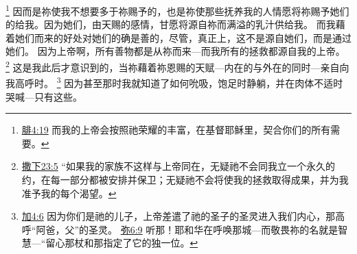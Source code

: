 \documentclass[12pt, a4paper, oneside]{ctexart}
\begin{document}
    \footnote {
        \href{https://biblehub.com/philippians/4-19.htm}{腓4:19} 而我的上帝会按照祂荣耀的丰富，在基督耶稣里，契合你们的所有需要。
	}
	因而是祢使我不想要多于祢赐予的，也是祢使那些抚养我的人情愿将祢赐予她们的给我。因为她们，由天赐的感情，甘愿将源自祢而满溢的乳汁供给我。
	而我藉着她们而来的好处对她们的确是善的，尽管，真正上，这不是源自她们，而是通过她们。
	因为上帝啊，所有善物都是从祢而来---而我所有的拯救都源自我的上帝。
    \footnote {
        \href{https://biblehub.com/2_samuel/23-5.htm}{撒下23:5} “如果我的家族不这样与上帝同在，无疑祂不会同我立一个永久的约，在每一部分都被安排并保卫；无疑祂不会将使我的拯救取得成果，并为我准予我的每个渴望。
	}
	这是我此后才意识到的，当祢藉着祢恩赐的天赋---内在的与外在的同时---亲自向我高呼时。
    \footnote {
        \href{https://biblehub.com/galatians/4-6.htm}{加4:6} 因为你们是祂的儿子，上帝差遣了祂的圣子的圣灵进入我们内心，那高呼“阿爸，父”的圣灵。
        \href{https://biblehub.com/micah/6-9.htm}{弥6:9} 听那！耶和华在呼唤那城---而敬畏祢的名就是智慧---“留心那杖和那指定了它的独一位。
	}
	因为甚至那时我就知道了如何吮吸，饱足时静躺，并在肉体不适时哭喊---只有这些。
\end{document}
